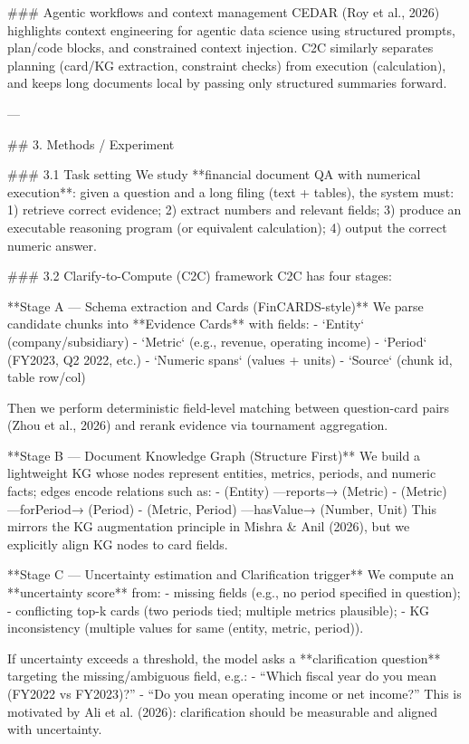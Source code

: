 ### Agentic workflows and context management  
CEDAR (Roy et al., 2026) highlights context engineering for agentic data science using structured prompts, plan/code blocks, and constrained context injection. C2C similarly separates planning (card/KG extraction, constraint checks) from execution (calculation), and keeps long documents local by passing only structured summaries forward.

---

## 3. Methods / Experiment  

### 3.1 Task setting  
We study **financial document QA with numerical execution**: given a question and a long filing (text + tables), the system must:  
1) retrieve correct evidence;  
2) extract numbers and relevant fields;  
3) produce an executable reasoning program (or equivalent calculation);  
4) output the correct numeric answer.

### 3.2 Clarify-to-Compute (C2C) framework  
C2C has four stages:

**Stage A — Schema extraction and Cards (FinCARDS-style)**  
We parse candidate chunks into **Evidence Cards** with fields:  
- `Entity` (company/subsidiary)  
- `Metric` (e.g., revenue, operating income)  
- `Period` (FY2023, Q2 2022, etc.)  
- `Numeric spans` (values + units)  
- `Source` (chunk id, table row/col)  

Then we perform deterministic field-level matching between question-card pairs (Zhou et al., 2026) and rerank evidence via tournament aggregation.

**Stage B — Document Knowledge Graph (Structure First)**  
We build a lightweight KG whose nodes represent entities, metrics, periods, and numeric facts; edges encode relations such as:  
- (Entity) —reports→ (Metric)  
- (Metric) —forPeriod→ (Period)  
- (Metric, Period) —hasValue→ (Number, Unit)  
This mirrors the KG augmentation principle in Mishra & Anil (2026), but we explicitly align KG nodes to card fields.

**Stage C — Uncertainty estimation and Clarification trigger**  
We compute an **uncertainty score** from:  
- missing fields (e.g., no period specified in question);  
- conflicting top-k cards (two periods tied; multiple metrics plausible);  
- KG inconsistency (multiple values for same (entity, metric, period)).  

If uncertainty exceeds a threshold, the model asks a **clarification question** targeting the missing/ambiguous field, e.g.:  
- “Which fiscal year do you mean (FY2022 vs FY2023)?”  
- “Do you mean operating income or net income?”  
This is motivated by Ali et al. (2026): clarification should be measurable and aligned with uncertainty.

